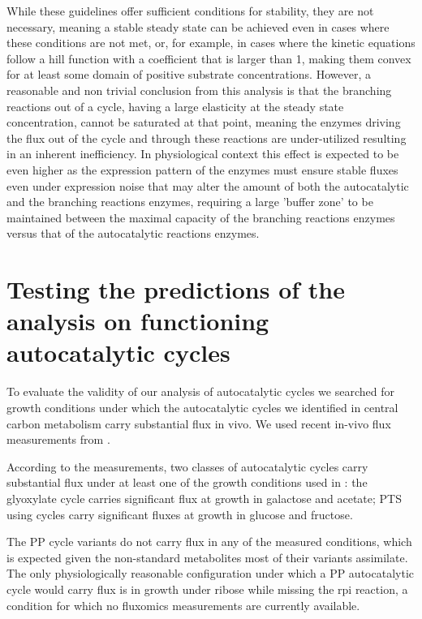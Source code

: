 \documentclass[a4page,notitlepage]{article}
\begin{document}
    While these guidelines offer sufficient conditions for stability, they are not necessary, meaning a stable steady state can be achieved even in cases where these conditions are not met, or, for example, in cases where the kinetic equations follow a hill function with a coefficient that is larger than 1, making them convex for at least some domain of positive substrate concentrations.
    However, a reasonable and non trivial conclusion from this analysis is that the branching reactions out of a cycle, having a large elasticity at the steady state concentration, cannot be saturated at that point, meaning the enzymes driving the flux out of the cycle and through these reactions are under-utilized resulting in an inherent inefficiency.
    In physiological context this effect is expected to be even higher as the expression pattern of the enzymes must ensure stable fluxes even under expression noise that may alter the amount of both the autocatalytic and the branching reactions enzymes, requiring a large 'buffer zone' to be maintained between the maximal capacity of the branching reactions enzymes versus that of the autocatalytic reactions enzymes.

    \section{Testing the predictions of the analysis on functioning autocatalytic cycles}
    To evaluate the validity of our analysis of autocatalytic cycles we searched for growth conditions under which the autocatalytic cycles we identified in central carbon metabolism carry substantial flux in vivo.
    We used recent in-vivo flux measurements from \cite{Gerosa2015-oq}.

    According to the measurements, two classes of autocatalytic cycles carry substantial flux under at least one of the growth conditions used in \cite{Gerosa2015-oq}:
    the glyoxylate cycle carries significant flux at growth in galactose and acetate;
    PTS using cycles carry significant fluxes at growth in glucose and fructose.

    The PP cycle variants do not carry flux in any of the measured conditions, which is expected given the non-standard metabolites most of their variants assimilate.
    The only physiologically reasonable configuration under which a PP autocatalytic cycle would carry flux is in growth under ribose while missing the rpi reaction, a condition for which no fluxomics measurements are currently available.
\end{document}
